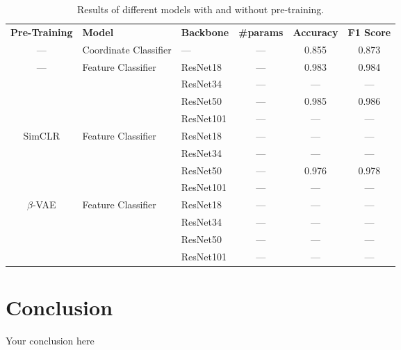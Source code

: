 \documentclass{article}
\begin{document}
\begin{table}[!htp]\centering
  \caption{Results of different models with and without pre-training.}\label{tab:results}
  \scriptsize
  \begin{tabular}{cllccc}\toprule
    \textbf{Pre-Training}        & \textbf{Model}                      & \textbf{Backbone} & \textbf{\#params} & \textbf{Accuracy} & \textbf{F1 Score} \\\cmidrule{1-6}
    ---                          & Coordinate Classifier               & ---               & ---               & 0.855             & 0.873             \\\cmidrule{1-6}
    \multirow{4}{*}{---}         & \multirow{4}{*}{Feature Classifier} & ResNet18          & ---               & 0.983             & 0.984             \\
                                 &                                     & ResNet34          & ---               & ---               & ---               \\
                                 &                                     & ResNet50          & ---               & 0.985             & 0.986             \\
                                 &                                     & ResNet101         & ---               & ---               & ---               \\\cmidrule{1-6}
    \multirow{4}{*}{SimCLR}      & \multirow{4}{*}{Feature Classifier} & ResNet18          & ---               & ---               & ---               \\
                                 &                                     & ResNet34          & ---               & ---               & ---               \\
                                 &                                     & ResNet50          & ---               & 0.976             & 0.978             \\
                                 &                                     & ResNet101         & ---               & ---               & ---               \\\cmidrule{1-6}
    \multirow{4}{*}{$\beta$-VAE} & \multirow{4}{*}{Feature Classifier} & ResNet18          & ---               & ---               & ---               \\
                                 &                                     & ResNet34          & ---               & ---               & ---               \\
                                 &                                     & ResNet50          & ---               & ---               & ---               \\
                                 &                                     & ResNet101         & ---               & ---               & ---               \\\midrule
    \bottomrule
  \end{tabular}
\end{table}

\section{Conclusion}
Your conclusion here



\end{document}
